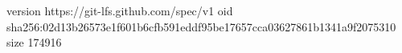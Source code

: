 version https://git-lfs.github.com/spec/v1
oid sha256:02d13b26573e1f601b6cfb591eddf95be17657cca03627861b1341a9f2075310
size 174916
